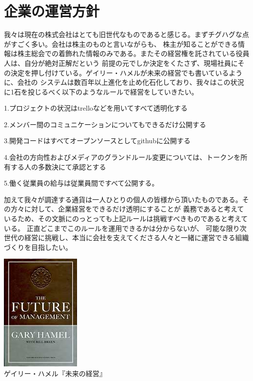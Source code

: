 \documentclass{jsarticle}
\begin{document}
\section{企業の運営方針}
我々は現在の株式会社はとても旧世代なものであると感じる。まずチグハグな点がすごく多い。会社は株主のものと言いながらも、
株主が知ることができる情報は株主総会での着飾れた情報のみである。またその経営権を託されている役員人は、自分が絶対正解だという
前提の元でしか決定をくたさず、現場社員にその決定を押し付けている。ゲイリー・ハメルが未来の経営でも書いているように、会社の
システムは数百年以上進化を止め化石化しており、我々はこの状況に1石を投じるべく以下のようなルールで経営をしていきたい。

1.プロジェクトの状況はtrelloなどを用いてすべて透明化する

2.メンバー間のコミュニケーションについてもできるだけ公開する

3.開発コードはすべてオープンソースとしてgithubに公開する

4.会社の方向性およびメディアのグランドルール変更については、トークンを所有する人の多数決にて承認とする

5.働く従業員の給与は従業員間ですべて公開する。 

加えて我々が調達する通貨は一人ひとりの個人の皆様から頂いたものである。その方々に対して、企業経営をできるだけ透明にすることが
義務であると考えているため、その文脈にのっとっても上記ルールは挑戦すべきものであると考えている。
正直どこまでこのルールを運用できるかは分からないが、
可能な限り次世代の経営に挑戦し、本当に会社を支えてくださる人々と一緒に運営できる組織づくりを目指したい。

\begin{center}
	\includegraphics[scale=0.4]{img/thefutureofmanagement.jpg} \\
	ゲイリー・ハメル『未来の経営』
\end{center}
\end{document}
